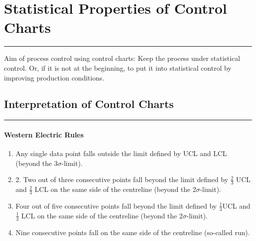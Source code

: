 \section{Statistical Properties of Control Charts}
\noindent\rule[\linienAbstand]{\linewidth}{\linienDickeDick}
Aim of process control using control charts: Keep the process under statistical control.
Or, if it is not at the beginning, to put it into statistical control by improving production conditions.

\subsection{Interpretation of Control Charts}
\noindent\rule[\linienAbstand]{\linewidth}{\linienDicke}

\paragraph{Western Electric Rules}
\begin{enumerate}
  \item Any single data point falls outside the limit defined by UCL and LCL (beyond the 3$\sigma$-limit).
  \item 2. Two out of three consecutive points fall beyond the limit defined by $\frac{2}{3}$ UCL and $\frac{2}{3}$ LCL on the same side of the centreline (beyond the 2$\sigma$-limit).
  \item Four out of five consecutive points fall beyond the limit defined by $\frac{1}{3}$UCL and $\frac{1}{3}$ LCL on the same side of the centreline (beyond the 2$\sigma$-limit).
  \item Nine consecutive points fall on the same side of the centreline (so-called run).
\end{enumerate}

